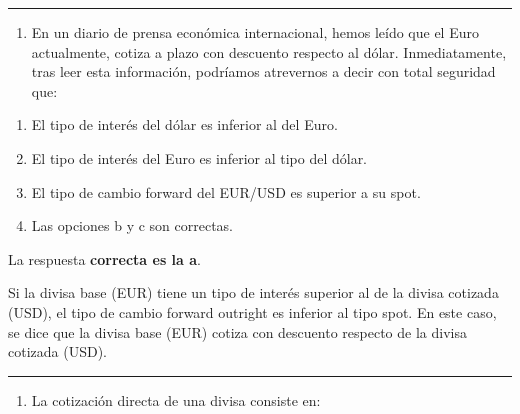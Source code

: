 \documentclass[
  letterpaper,
  DIV=11,
  numbers=noendperiod]{scrreprt}
\providecommand{\tightlist}{%
  \setlength{\itemsep}{0pt}\setlength{\parskip}{0pt}}\usepackage{longtable,booktabs,array}
\begin{document}
\begin{center}\rule{0.5\linewidth}{0.5pt}\end{center}

\begin{enumerate}
\def\labelenumi{\arabic{enumi}.}
\setcounter{enumi}{29}
\tightlist
\item
  En un diario de prensa económica internacional, hemos leído que el
  Euro actualmente, cotiza a plazo con descuento respecto al dólar.
  Inmediatamente, tras leer esta información, podríamos atrevernos a
  decir con total seguridad que:
\end{enumerate}

\begin{enumerate}
\def\labelenumi{\alph{enumi}.}
\item
  El tipo de interés del dólar es inferior al del Euro.
\item
  El tipo de interés del Euro es inferior al tipo del dólar.
\item
  El tipo de cambio forward del EUR/USD es superior a su spot.
\item
  Las opciones b y c son correctas.
\end{enumerate}

\begin{tcolorbox}[enhanced jigsaw, left=2mm, opacityback=0, colback=white, breakable, arc=.35mm, bottomrule=.15mm, rightrule=.15mm, toprule=.15mm, leftrule=.75mm, colframe=quarto-callout-tip-color-frame]
\begin{minipage}[t]{5.5mm}
\textcolor{quarto-callout-tip-color}{\faLightbulb}
\end{minipage}%
\begin{minipage}[t]{\textwidth - 5.5mm}

La respuesta \textbf{correcta es la a}.

Si la divisa base (EUR) tiene un tipo de interés superior al de la
divisa cotizada (USD), el tipo de cambio forward outright es inferior al
tipo spot. En este caso, se dice que la divisa base (EUR) cotiza con
descuento respecto de la divisa cotizada (USD).

\end{minipage}%
\end{tcolorbox}

\begin{center}\rule{0.5\linewidth}{0.5pt}\end{center}

\begin{enumerate}
\def\labelenumi{\arabic{enumi}.}
\setcounter{enumi}{30}
\tightlist
\item
  La cotización directa de una divisa consiste en:
\end{enumerate}
\end{document}

